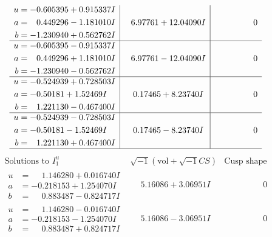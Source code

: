 \documentclass[1p]{elsarticle_modified}
\theoremstyle{definition}
\newcommand{\I}{\sqrt{-1}}
\begin{document}
$$\begin{array}{c|c|c}
\begin{aligned}
u &= -0.605395 + 0.915337 I \\
a &= \phantom{-}0.449296 - 1.181010 I \\
b &= -1.230940 + 0.562762 I\end{aligned}
 & \phantom{-}6.97761 + 12.04090 I & \phantom{-0.000000 } 0 \\ \hline\begin{aligned}
u &= -0.605395 - 0.915337 I \\
a &= \phantom{-}0.449296 + 1.181010 I \\
b &= -1.230940 - 0.562762 I\end{aligned}
 & \phantom{-}6.97761 - 12.04090 I & \phantom{-0.000000 } 0 \\ \hline\begin{aligned}
u &= -0.524939 + 0.728503 I \\
a &= -0.50181 + 1.52469 I \\
b &= \phantom{-}1.221130 - 0.467400 I\end{aligned}
 & \phantom{-}0.17465 + 8.23740 I & \phantom{-0.000000 } 0 \\ \hline\begin{aligned}
u &= -0.524939 - 0.728503 I \\
a &= -0.50181 - 1.52469 I \\
b &= \phantom{-}1.221130 + 0.467400 I\end{aligned}
 & \phantom{-}0.17465 - 8.23740 I & \phantom{-0.000000 } 0\\
 \hline 
 \end{array}$$\newpage$$\begin{array}{c|c|c}  
\text{Solutions to }I^u_{1}& \I (\text{vol} + \sqrt{-1}CS) & \text{Cusp shape}\\
 \hline 
\begin{aligned}
u &= \phantom{-}1.146280 + 0.016740 I \\
a &= -0.218153 + 1.254070 I \\
b &= \phantom{-}0.883487 - 0.824717 I\end{aligned}
 & \phantom{-}5.16086 + 3.06951 I & \phantom{-0.000000 } 0 \\ \hline\begin{aligned}
u &= \phantom{-}1.146280 - 0.016740 I \\
a &= -0.218153 - 1.254070 I \\
b &= \phantom{-}0.883487 + 0.824717 I\end{aligned}
 & \phantom{-}5.16086 - 3.06951 I & \phantom{-0.000000 } 0 \\ \hline\begin{aligned}

\end{aligned}
\end{array}$$
\end{document}
